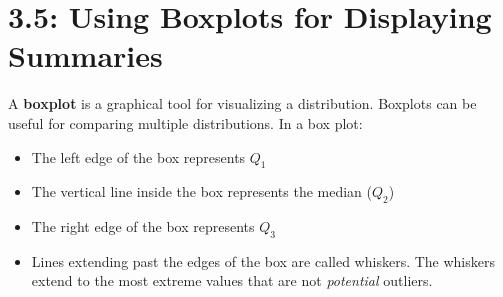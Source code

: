 \documentclass[../mathNotesPreamble]{subfiles}
\begin{document}
  \section{3.5: Using Boxplots for Displaying Summaries}
    
  \begin{defn*}
    A \textbf{boxplot} is a graphical tool for visualizing a distribution. Boxplots can be useful for comparing multiple distributions. In a box plot:
    \begin{itemize}
      \item The left edge of the box represents $Q_1$
      \item The vertical line inside the box represents the median ($Q_2$)
      \item The right edge of the box represents $Q_3$
      \item Lines extending past the edges of the box are called whiskers. The whiskers extend to the most extreme values that are not \emph{potential} outliers.
    \end{itemize}
  \end{defn*}
  
\end{document}
